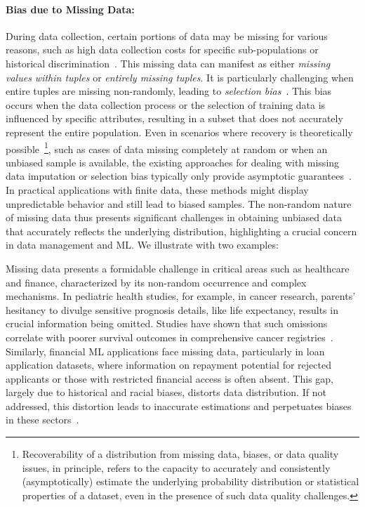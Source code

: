 \documentclass[11pt]{article}
\begin{document}
\vspace{-0.4cm}
\paragraph{Bias due to Missing Data:} During data collection, certain portions of data may be missing for various reasons, such as high data collection costs for specific sub-populations or historical discrimination~\cite{antman1985selection}. This missing data can manifest as either \textit{missing values within tuples} or \textit{entirely missing tuples}. It is particularly challenging when entire tuples are missing non-randomly, leading to {\em selection bias}~\cite{choi1995effect}. This bias occurs when the data collection process or the selection of training data is influenced by specific attributes, resulting in a subset that does not accurately represent the entire population. Even in scenarios where recovery is theoretically possible~\footnote{Recoverability of a distribution from missing data, biases, or data quality issues, in principle, refers to the capacity to accurately and consistently (asymptotically) estimate the underlying probability distribution or statistical properties of a dataset, even in the presence of such data quality challenges.}, 
such as cases of data missing completely at random or when an unbiased sample is available, the existing approaches for dealing with missing data imputation or selection bias typically only provide asymptotic guarantees~\cite{rubin1978multiple,schenker1988asymptotic,kim2004finite}. In practical applications with finite data, these methods might display unpredictable behavior and still lead to biased samples. The non-random nature of missing data thus presents significant challenges in obtaining unbiased data that accurately reflects the underlying distribution, highlighting a crucial concern in data management and ML. We illustrate with two examples: 


\begin{example}\label{ex:missing-val-children-health}
Missing data presents a formidable challenge in critical areas such as healthcare and finance, characterized by its non-random occurrence and complex mechanisms. In pediatric health studies, for example, in cancer research, parents' hesitancy to divulge sensitive prognosis details, like life expectancy, results in crucial information being omitted. Studies have shown that such omissions correlate with poorer survival outcomes in comprehensive cancer registries~\cite{Rosenberg2014What's, plichta2023implications}. Similarly, financial ML applications face missing data, particularly in loan application datasets, where information on repayment potential for rejected applicants or those with restricted financial access is often absent. This gap, largely due to historical and racial biases, distorts data distribution. If not addressed, this distortion leads to inaccurate estimations and perpetuates biases in these sectors~\cite{plichta2023implications,luo2017validity,ehrhardt2021reject}.
\end{example}
\end{document}
